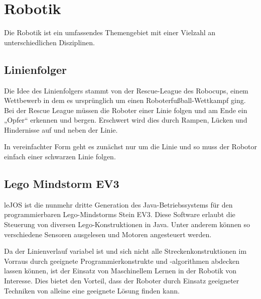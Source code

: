 \chapter{Robotik} %
\label{cha:robotik}

Die Robotik ist ein umfassendes Themengebiet mit einer Vielzahl an un\-ter\-schied\-lichen Disziplinen.

\section{Linienfolger} %
\label{sec:linienfolger}

Die Idee des Linienfolgers stammt von der Rescue-League des Robocups, einem Wettbewerb in dem es ursprünglich um einen Roboterfußball-Wettkampf ging. Bei der Rescue League müssen die Roboter einer Linie folgen und am Ende ein „Opfer“ erkennen und bergen. Erschwert wird dies durch Rampen, Lücken und Hindernisse auf und neben der Linie.\par
In vereinfachter Form geht es zunächst nur um die Linie und so muss der Robotor einfach einer schwarzen Linie folgen.


\section{Lego Mindstorm EV3} %
\label{sec:lego_mindstorm_ev3}

leJOS ist die nunmehr dritte Generation des Java-Betriebssystems für den programmierbaren Lego-Mindstorms Stein EV3. Diese Software erlaubt die Steuerung von diversen Lego-Konstruktionen in Java. Unter anderem können so verschiedene Sensoren ausgelesen und Motoren angesteuert werden.\par
Da der Linienverlauf variabel ist und sich nicht alle Streckenkonstruktionen im Vorraus durch geeignete Programmierkonstrukte und -algorithmen abdecken lassen können, ist der Einsatz von Maschinellem Lernen in der Robotik von Interesse. Dies bietet den Vorteil, dass der Roboter durch Einsatz geeigneter Techniken von alleine eine geeignete Lösung finden kann.


